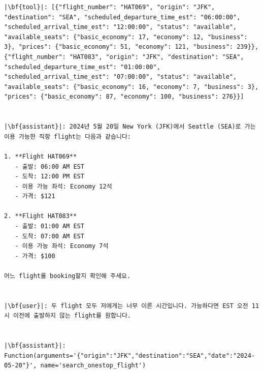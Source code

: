 \begin{verbatim}
|\bf{tool}|: [{"flight_number": "HAT069", "origin": "JFK", "destination": "SEA", "scheduled_departure_time_est": "06:00:00", "scheduled_arrival_time_est": "12:00:00", "status": "available", "available_seats": {"basic_economy": 17, "economy": 12, "business": 3}, "prices": {"basic_economy": 51, "economy": 121, "business": 239}}, {"flight_number": "HAT083", "origin": "JFK", "destination": "SEA", "scheduled_departure_time_est": "01:00:00", "scheduled_arrival_time_est": "07:00:00", "status": "available", "available_seats": {"basic_economy": 16, "economy": 7, "business": 3}, "prices": {"basic_economy": 87, "economy": 100, "business": 276}}]


|\bf{assistant}|: 2024년 5월 20일 New York (JFK)에서 Seattle (SEA)로 가는 이용 가능한 직항 flight는 다음과 같습니다:

1. **Flight HAT069**
   - 출발: 06:00 AM EST
   - 도착: 12:00 PM EST
   - 이용 가능 좌석: Economy 12석
   - 가격: $121

2. **Flight HAT083**
   - 출발: 01:00 AM EST
   - 도착: 07:00 AM EST
   - 이용 가능 좌석: Economy 7석
   - 가격: $100

어느 flight를 booking할지 확인해 주세요.


|\bf{user}|: 두 flight 모두 저에게는 너무 이른 시간입니다. 가능하다면 EST 오전 11시 이전에 출발하지 않는 flight를 원합니다.


|\bf{assistant}|: Function(arguments='{"origin":"JFK","destination":"SEA","date":"2024-05-20"}', name='search_onestop_flight')



\end{verbatim}
